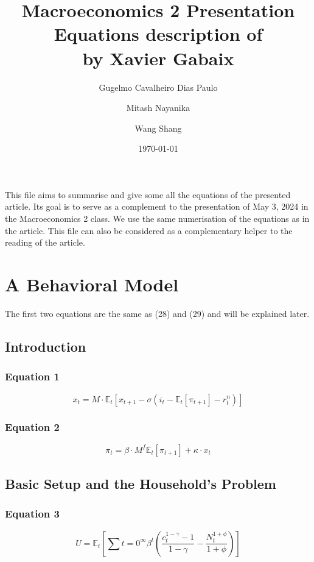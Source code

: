 \documentclass{article}
\title{Macroeconomics 2 Presentation \\ Equations description of \\ \textquote{A Behavioral New Keynesian Model} by Xavier Gabaix}
\author{Gugelmo Cavalheiro Dias Paulo \\ \and Mitash Nayanika \\ \and Wang Shang}
\date{\today}
\begin{document}
\maketitle

This file aims to summarise and give some all the equations of the presented article.
Its goal is to serve as a complement to the presentation of May 3, 2024 in the Macroeconomics 2 class. 
We use the same numerisation of the equations as in the article.
This file can also be considered as a complementary helper to the reading of the article.

\pagebreak
\tableofcontents
\pagebreak



\section{A Behavioral Model}
The first two equations are the same as (28) and (29) and will be explained later.

\subsection{Introduction}

\subsubsection*{Equation 1}
\begin{equation}\tag{1}
    x_{t}=M\cdot\mathbb{E}_{t}\left[ x_{t+1} -\sigma (i_{t}-\mathbb{E}_{t}\left[\pi_{t+1}\right]-r^{n}_{t})\right]
\end{equation}

\subsubsection*{Equation 2}
\begin{equation}\tag{2}
    \pi_{t}=\beta\cdot M^{f} \mathbb{E}_{t}\left[\pi_{t+1}\right]+\kappa\cdot x_{t}
\end{equation}

\subsection{Basic Setup and the Household’s Problem}

\subsubsection*{Equation 3}
\begin{equation}\tag{3}
    U = \mathbb{E}_{t} \left[ \sum{t=0}^{\infty} \beta^{t}\left(\frac{c_{t}^{1-\gamma}-1}{1-\gamma} - \frac{N_{t}^{1+\phi}}{1+\phi}\right)\right]
\end{equation}
\end{document}
